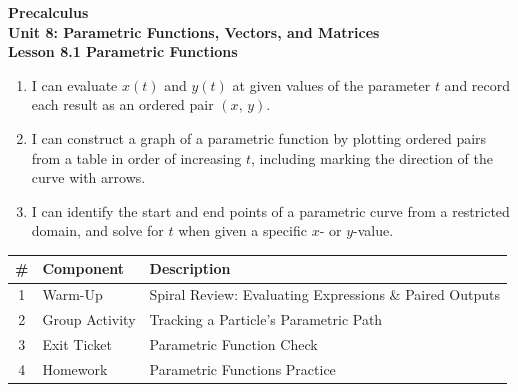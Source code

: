 \documentclass[10pt]{article}
\begin{document}
\vspace{-0.8in}

\begin{center}
  {\color{white}\textbf{\LARGE Precalculus}}\\[4pt]
  {\color{skymid}\large\textbf{Unit 8: Parametric Functions, Vectors, and Matrices}}\\[6pt]
  {\color{white}\textbf{\large Lesson 8.1 \quad Parametric Functions}}
\end{center}

\vspace{0.22in}
\namedateperiod
\vspace{0.18in}

\begin{learningtargetbox}
\small
\begin{enumerate}[leftmargin=1.5em, itemsep=5pt]
  \item I can evaluate $x(t)$ and $y(t)$ at given values of the parameter $t$
    and record each result as an ordered pair $(x,\, y)$.
  \item I can construct a graph of a parametric function by plotting ordered
    pairs from a table in order of increasing $t$, including marking the
    direction of the curve with arrows.
  \item I can identify the start and end points of a parametric curve from a
    restricted domain, and solve for $t$ when given a specific $x$- or
    $y$-value.
\end{enumerate}
\end{learningtargetbox}

\vspace{0.14in}

\begin{tocbox}
\small
\renewcommand{\arraystretch}{1.5}
\begin{tabularx}{\linewidth}{@{} c l X @{}}
\rowcolor{sky}
\textbf{\#} & \textbf{Component} & \textbf{Description} \\
\midrule
1 & Warm-Up        & Spiral Review: Evaluating Expressions \& Paired Outputs \\
2 & Group Activity & Tracking a Particle's Parametric Path \\
3 & Exit Ticket    & Parametric Function Check \\
4 & Homework       & Parametric Functions Practice \\
\end{tabularx}
\end{tocbox}
\end{document}
